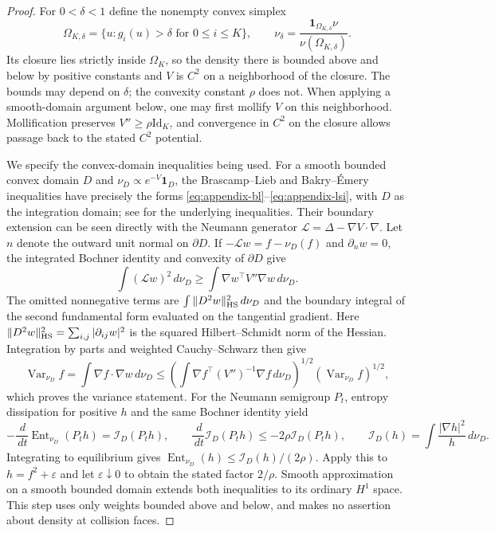 \documentclass[11pt,reqno]{amsart}
\numberwithin{equation}{section}
\theoremstyle{definition}
\theoremstyle{remark}
\newcommand{\1}{\mathbf 1}
\newcommand{\Var}{\operatorname{Var}}
\newcommand{\Ent}{\operatorname{Ent}}
\newcommand{\Id}{\mathrm{Id}}
\newcommand{\dd}{\,d}
\begin{document}
\begin{proof}
For $0<\delta<1$ define the nonempty convex simplex
\[
\Omega_{K,\delta}=\{u:g_i(u)>\delta\text{ for }0\le i\le K\},
\qquad
\nu_\delta=\frac{\1_{\Omega_{K,\delta}}\nu}
 {\nu(\Omega_{K,\delta})}.
\]
Its closure lies strictly inside $\Omega_K$, so the density there
is bounded above and below by positive constants and $V$ is $C^2$
on a neighborhood of the closure. The bounds may depend on $\delta$; the convexity
constant $\rho$ does not. When applying a smooth-domain argument below,
one may first mollify $V$ on this neighborhood. Mollification preserves
$V''\ge\rho\Id_K$, and convergence in $C^2$ on the closure allows
passage back to the stated $C^2$ potential.

We specify the convex-domain inequalities being used. For a smooth
bounded convex domain $D$ and $\nu_D\propto e^{-V}\1_D$, the
Brascamp--Lieb and Bakry--\'Emery inequalities have precisely the
forms \eqref{eq:appendix-bl}--\eqref{eq:appendix-lsi}, with $D$
as the integration domain; see \cite{BL,BE} for the underlying
inequalities. Their boundary extension can be seen directly with
the Neumann generator $\mathcal L=\Delta-\nabla V\cdot\nabla$.
Let $n$ denote the outward unit normal on $\partial D$.
If $-\mathcal Lw=f-\nu_D(f)$ and $\partial_nw=0$, the integrated
Bochner identity and convexity of $\partial D$ give
\[
\int(\mathcal Lw)^2\dd\nu_D
\ge\int\nabla w^\top V''\nabla w\dd\nu_D.
\]
The omitted nonnegative terms are
$\int\|D^2w\|_{\rm HS}^2\dd\nu_D$ and the boundary integral of the
second fundamental form evaluated on the tangential gradient. Here
$\|D^2w\|_{\rm HS}^2=\sum_{i,j}|\partial_{ij}w|^2$ is the squared
Hilbert--Schmidt norm of the Hessian. Integration by parts
and weighted Cauchy--Schwarz then give
\[
\Var_{\nu_D}f=\int\nabla f\cdot\nabla w\dd\nu_D
\le\left(\int\nabla f^\top(V'')^{-1}\nabla f\dd\nu_D\right)^{1/2}
   (\Var_{\nu_D}f)^{1/2},
\]
which proves the variance statement. For the Neumann semigroup
$P_t$, entropy dissipation for positive $h$ and the same Bochner
identity yield
\[
-\frac{\dd}{\dd t}\Ent_{\nu_D}(P_th)
 =\mathscr I_D(P_th),\qquad
\frac{\dd}{\dd t}\mathscr I_D(P_th)\le-2\rho \mathscr I_D(P_th),\qquad
\mathscr I_D(h)=\int\frac{|\nabla h|^2}{h}\dd\nu_D.
\]
Integrating to equilibrium gives
$\Ent_{\nu_D}(h)\le \mathscr I_D(h)/(2\rho)$.
Apply this to $h=f^2+\varepsilon$ and let $\varepsilon\downarrow0$
to obtain the stated factor $2/\rho$. Smooth approximation on a
smooth bounded domain extends both inequalities to its ordinary
$H^1$ space. This step uses only weights bounded above and below,
and makes no assertion about density at collision faces.


\end{proof}
\end{document}
